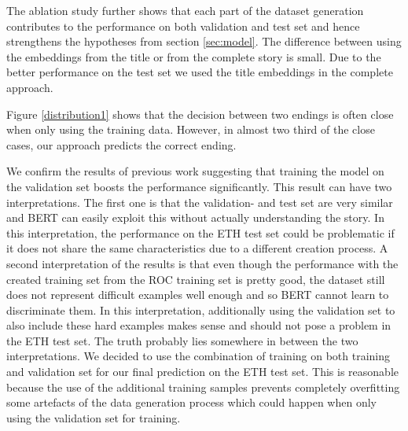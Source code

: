 \documentclass{article}
\begin{document}
The ablation study further shows that each part of the dataset generation contributes to the performance on both validation and test set and hence strengthens the hypotheses from section \ref{sec:model}. The difference between using the embeddings from the title or from the complete story is small. Due to the better performance on the test set we used the title embeddings in the complete approach.

Figure \ref{distribution1} shows that the decision between two endings is often close when only using the training data. However, in almost two third of the close cases, our approach predicts the correct ending.

We confirm the results of previous work \cite{DBLP:journals/corr/abs-1803-05547} suggesting that training the model on the validation set boosts the performance significantly.
This result can have two interpretations. 
The first one is that the validation- and test set are very similar and BERT can easily exploit this without actually understanding the story. In this interpretation, the performance on the ETH test set could be problematic if it does not share the same characteristics due to a different creation process.
A second interpretation of the results is that even though the performance with the created training set from the ROC training set is pretty good, the dataset still does not represent difficult examples well enough and so BERT cannot learn to discriminate them.
In this interpretation, additionally using the validation set to also include these hard examples makes sense and should not pose a problem in the ETH test set.
The truth probably lies somewhere in between the two interpretations. We decided to use the combination of training on both training and validation set for our final prediction on the ETH test set. This is reasonable because the use of the additional training samples prevents completely overfitting some artefacts of the data generation process which could happen when only using the validation set for training.
\end{document}
